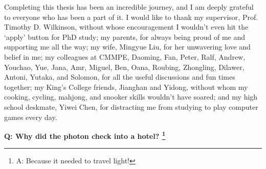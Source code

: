 
\begin{acknowledgements}

Completing this thesis has been an incredible journey, and I am deeply grateful to everyone who has been a part of it. I would like to thank my supervisor, Prof. Timothy D. Wilkinson, without whose encouragement I wouldn't even hit the `apply' button for PhD study; my parents, for always being proud of me and supporting me all the way; my wife, Mingyue Liu, for her unwavering love and belief in me; my colleagues at CMMPE, Daoming, Fan, Peter, Ralf, Andrew, Youchao, Yue, Jana, Amr, Miguel, Ben, Oana, Roubing, Zhongling, Dilawer, Antoni, Yutaka, and Solomon, for all the useful discussions and fun times together; my King's College friends, Jianghan and Yidong, without whom my cooking, cycling, mahjong, and snooker skills wouldn't have soared; and my high school deskmate, Yiwei Chen, for distracting me from studying to play computer games every day.

\begin{center}
    \textbf{Q: Why did the photon check into a hotel? \footnote{A: Because it needed to travel light!}}
\end{center}


\end{acknowledgements}
